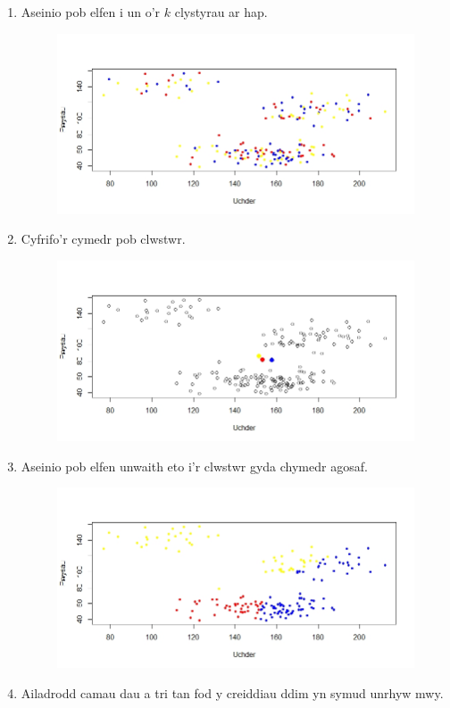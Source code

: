 \begin{enumerate}
\item Aseinio pob elfen i un o'r $k$ clystyrau ar hap.

\begin{figure}[H]
\begin{center}
\includegraphics[width=0.5\linewidth]{../img/Cam1.jpeg}
\end{center}
\end{figure}

\item Cyfrifo'r cymedr pob clwstwr.

\begin{figure}[H]
\begin{center}
\includegraphics[width=0.5\linewidth]{../img/ClystyrauCychwynol.jpeg}
\end{center}
\end{figure}

\item Aseinio pob elfen unwaith eto i'r clwstwr gyda chymedr agosaf.

\begin{figure}[H]
\begin{center}
\includegraphics[width=0.5\linewidth]{../img/Cam3.jpeg}
\end{center}
\end{figure}

\item Ailadrodd camau dau a tri tan fod y creiddiau ddim yn symud unrhyw mwy.


\end{enumerate}
